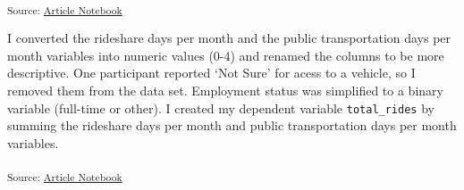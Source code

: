 \documentclass[
  letterpaper,
  DIV=11,
  numbers=noendperiod]{scrartcl}
\begin{document}
\textsubscript{Source:
\href{https://RachelRapier.github.io/psych_755_project/index.qmd.html}{Article
Notebook}}

I converted the rideshare days per month and the public transportation
days per month variables into numeric values (0-4) and renamed the
columns to be more descriptive. One participant reported `Not Sure' for
acess to a vehicle, so I removed them from the data set. Employment
status was simplified to a binary variable (full-time or other). I
created my dependent variable \texttt{total\_rides} by summing the
rideshare days per month and public transportation days per month
variables.

\textsubscript{Source:
\href{https://RachelRapier.github.io/psych_755_project/index.qmd.html}{Article
Notebook}}

\protect{}\label{map-numeric-values}
\end{document}

